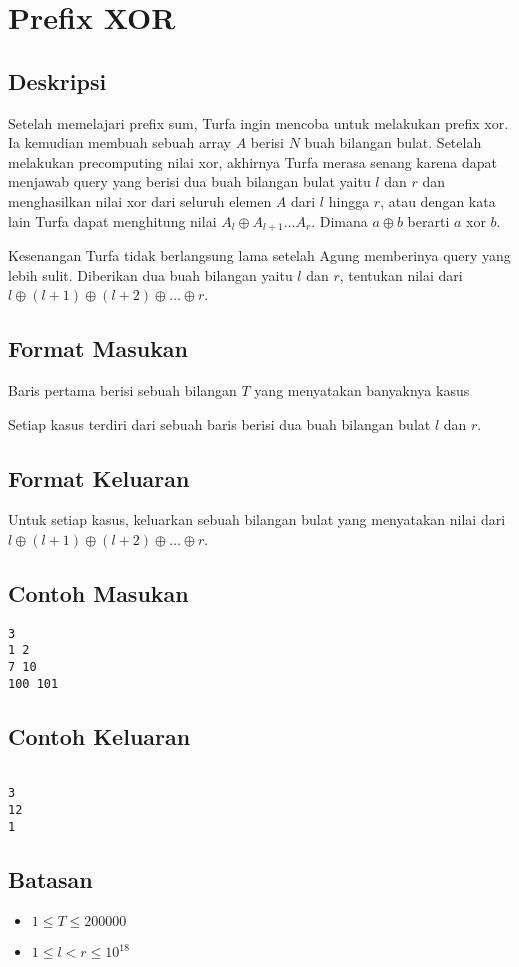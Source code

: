 \documentclass{article}
\begin{document}
\section*{\hfil Prefix XOR\hfil}

\subsection*{Deskripsi}
\par Setelah memelajari prefix sum, Turfa ingin mencoba untuk melakukan prefix xor. Ia kemudian membuah sebuah array $A$ berisi $N$ buah bilangan bulat. Setelah melakukan precomputing nilai xor, akhirnya Turfa merasa senang karena dapat menjawab query yang berisi dua buah bilangan bulat yaitu $l$ dan $r$ dan menghasilkan nilai xor dari seluruh elemen $A$ dari $l$ hingga $r$, atau dengan kata lain Turfa dapat menghitung nilai $A_l \oplus A_{l+1} \dots A_r$. Dimana $a \oplus b$ berarti $a$ xor $b$.

\par Kesenangan Turfa tidak berlangsung lama setelah Agung memberinya query yang lebih sulit. Diberikan dua buah bilangan yaitu $l$ dan $r$, tentukan nilai dari $l \oplus (l+1) \oplus (l+2) \oplus \dots \oplus r$.

\subsection*{Format Masukan}
\par Baris pertama berisi sebuah bilangan $T$ yang menyatakan banyaknya kasus
\par Setiap kasus terdiri dari sebuah baris berisi dua buah bilangan bulat $l$ dan $r$.

\subsection*{Format Keluaran}

\par Untuk setiap kasus, keluarkan sebuah bilangan bulat yang menyatakan nilai dari $l \oplus (l+1) \oplus (l+2) \oplus \dots \oplus r$.

\subsection*{Contoh Masukan}

\begin{lstlisting}
3
1 2
7 10
100 101

\end{lstlisting}

\subsection*{Contoh Keluaran}

\begin{lstlisting}

3
12
1

\end{lstlisting}

\subsection*{Batasan}

\begin{itemize}
	\item $1 \leq T \leq 200000$
	\item $1 \leq l < r \leq 10^{18}$
\end{itemize}
\end{document}
